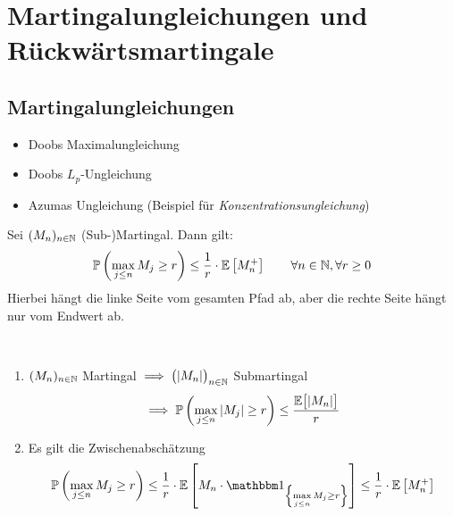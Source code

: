 
\chapter{Martingalungleichungen und Rückwärtsmartingale} %
\section{Martingalungleichungen} %
\begin{itemize}
	\item Doobs Maximalungleichung
	\item Doobs $L_p$-Ungleichung
	\item Azumas Ungleichung (Beispiel für \textit{Konzentrationsungleichung})
\end{itemize}

\setcounter{section}{5} %
\begin{theorem}\label{theorem5.1DoobMaximalungleichung}\enter
	Sei $(M_n)_{n\in\mathbb{N}}$ (Sub-)Martingal. Dann gilt:
	\begin{align*}
		\mathbb{P}\left(\max\limits_{j\leq n} M_j\geq r\right)\leq\frac{1}{r}\cdot\mathbb{E}\left[M_n^+\right]\qquad\forall n\in\mathbb{N},\forall r\geq0
	\end{align*}
	Hierbei hängt die linke Seite vom gesamten Pfad ab, aber die rechte Seite hängt nur vom Endwert ab.
\end{theorem}

\begin{bemerkung}\
	\begin{enumerate}[label=(\alph*)]
		\item $(M_n)_{n\in\mathbb{N}}$ Martingal $\implies\big(|M_n|\big)_{n\in\mathbb{N}}$ Submartingal
		\begin{align*}
			\implies\mathbb{P}\left(\max\limits_{j\leq n} |M_j|\geq r\right)\leq\frac{\mathbb{E}\big[|M_n|\big]}{r}
		\end{align*}
		\item Es gilt die Zwischenabschätzung
		\begin{align*}
			\P\left(\max\limits_{j\leq n} M_j\geq r\right)
			\leq
			\frac{1}{r}\cdot\E\left[M_n\cdot\indi_{\left\lbrace\max\limits_{j\leq n} M_j\geq r\right\rbrace}\right]
			\leq
			\frac{1}{r}\cdot\E\left[M_n^+\right]
		\end{align*}
	\end{enumerate}
\end{bemerkung}

